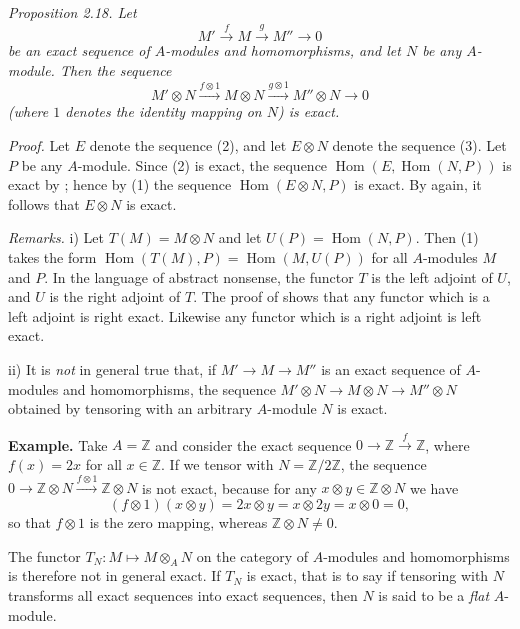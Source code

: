 \noindent\textit{Proposition 2.18. Let}
\begin{equation}
 M'\xrightarrow{f}M\xrightarrow{g}M''\longrightarrow0
 \tag{2}
\end{equation}
\textit{be an exact sequence of $A$-modules and homomorphisms, and let $N$ be any $A$-module. Then the sequence}
\begin{equation}
 M'\otimes N\xrightarrow{f\otimes1}M\otimes N\xrightarrow{g\otimes1}M''\otimes N\longrightarrow0
 \tag{3}
\end{equation}
\textit{(where $1$ denotes the identity mapping on $N$) is exact.}

\noindent\textit{Proof.} Let $E$ denote the sequence (2), and let $E\otimes N$ denote the sequence (3). Let $P$ be any $A$-module. Since (2) is exact, the sequence $\operatorname{Hom}(E,\operatorname{Hom}(N,P))$ is exact by ; hence by (1) the sequence $\operatorname{Hom}(E\otimes N,P)$ is exact. By  again, it follows that $E\otimes N$ is exact. \proofbox

\noindent\textit{Remarks.} i) Let $T(M)=M\otimes N$ and let $U(P)=\operatorname{Hom}(N,P)$. Then (1) takes the form $\operatorname{Hom}(T(M),P)=\operatorname{Hom}(M,U(P))$ for all $A$-modules $M$ and $P$. In the language of abstract nonsense, the functor $T$ is the left adjoint of $U$, and $U$ is the right adjoint of $T$. The proof of  shows that any functor which is a left adjoint is right exact. Likewise any functor which is a right adjoint is left exact.

ii) It is \textit{not} in general true that, if $M'\longrightarrow M\longrightarrow M''$ is an exact sequence of $A$-modules and homomorphisms, the sequence $M'\otimes N\longrightarrow M\otimes N\longrightarrow M''\otimes N$ obtained by tensoring with an arbitrary $A$-module $N$ is exact.

\noindent\textbf{Example.} Take $A=\mathbb Z$ and consider the exact sequence $0\longrightarrow\mathbb Z\xrightarrow{f}\mathbb Z$, where $f(x)=2x$ for all $x\in\mathbb Z$. If we tensor with $N=\mathbb Z/2\mathbb Z$, the sequence $0\longrightarrow\mathbb Z\otimes N\xrightarrow{f\otimes1}\mathbb Z\otimes N$ is not exact, because for any $x\otimes y\in\mathbb Z\otimes N$ we have
\[
 (f\otimes1)(x\otimes y)=2x\otimes y=x\otimes2y=x\otimes0=0,
\]
so that $f\otimes1$ is the zero mapping, whereas $\mathbb Z\otimes N\neq0$.

The functor $T_N:M\mapsto M\otimes_A N$ on the category of $A$-modules and homomorphisms is therefore not in general exact. If $T_N$ is exact, that is to say if tensoring with $N$ transforms all exact sequences into exact sequences, then $N$ is said to be a \textit{flat} $A$-module.

